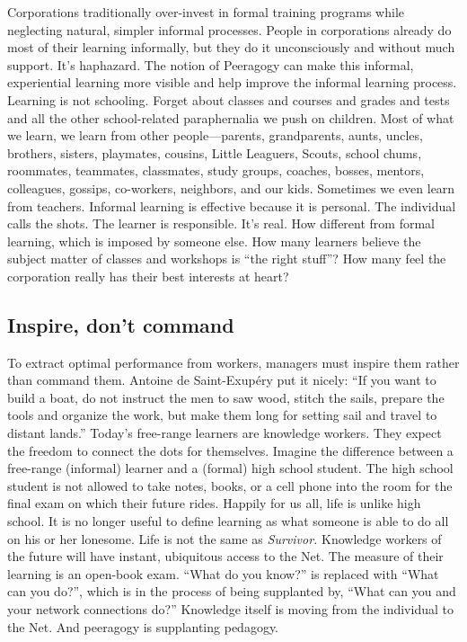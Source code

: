 Corporations traditionally over-invest in formal training programs while
neglecting natural, simpler informal processes. People in corporations
already do most of their learning informally, but they do it
unconsciously and without much support. It's haphazard. The notion of
Peeragogy can make this informal, experiential learning more visible and
help improve the informal learning process. Learning is not schooling.
Forget about classes and courses and grades and tests and all the other
school-related paraphernalia we push on children. Most of what we learn,
we learn from other people---parents, grandparents, aunts, uncles,
brothers, sisters, playmates, cousins, Little Leaguers, Scouts, school
chums, roommates, teammates, classmates, study groups, coaches, bosses,
mentors, colleagues, gossips, co-workers, neighbors, and our kids.
Sometimes we even learn from teachers. Informal learning is effective
because it is personal. The individual calls the shots. The learner is
responsible. It's real. How different from formal learning, which is
imposed by someone else. How many learners believe the subject matter of
classes and workshops is ``the right stuff''? How many feel the
corporation really has their best interests at heart?

\subsection{Inspire, don't command}

To extract optimal performance from workers, managers must inspire them
rather than command them. Antoine de Saint-Exupéry put it nicely: ``If
you want to build a boat, do not instruct the men to saw wood, stitch
the sails, prepare the tools and organize the work, but make them long
for setting sail and travel to distant lands.'' Today's free-range
learners are knowledge workers. They expect the freedom to connect the
dots for themselves. Imagine the difference between a free-range
(informal) learner and a (formal) high school student. The high school
student is not allowed to take notes, books, or a cell phone into the
room for the final exam on which their future rides. Happily for us all,
life is unlike high school. It is no longer useful to define learning as
what someone is able to do all on his or her lonesome. Life is not the
same as \emph{Survivor.} Knowledge workers of the future will have
instant, ubiquitous access to the Net. The measure of their learning is
an open-book exam. ``What do you know?'' is replaced with ``What can you
do?'', which is in the process of being supplanted by, ``What can you
and your network connections do?'' Knowledge itself is moving from the
individual to the Net. And peeragogy is supplanting pedagogy.

